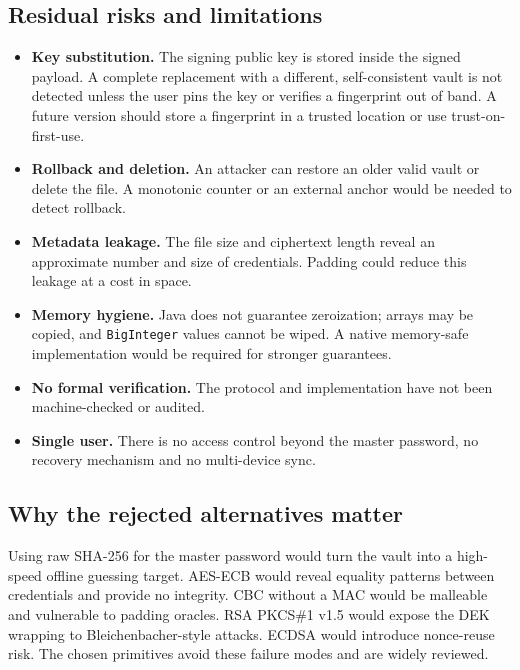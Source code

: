 \documentclass[11pt,a4paper]{article}
\newcommand{\code}[1]{\texttt{#1}}
\begin{document}
\subsection{Residual risks and limitations}\label{sec:limitations}

\begin{itemize}[leftmargin=*]
  \item \textbf{Key substitution.} The signing public key is stored inside the
        signed payload. A complete replacement with a different, self-consistent
        vault is not detected unless the user pins the key or verifies a
        fingerprint out of band. A future version should store a fingerprint in
        a trusted location or use trust-on-first-use.
  \item \textbf{Rollback and deletion.} An attacker can restore an older valid
        vault or delete the file. A monotonic counter or an external anchor
        would be needed to detect rollback.
  \item \textbf{Metadata leakage.} The file size and ciphertext length reveal an
        approximate number and size of credentials. Padding could reduce this
        leakage at a cost in space.
  \item \textbf{Memory hygiene.} Java does not guarantee zeroization; arrays may
        be copied, and \code{BigInteger} values cannot be wiped. A native
        memory-safe implementation would be required for stronger guarantees.
  \item \textbf{No formal verification.} The protocol and implementation have
        not been machine-checked or audited.
  \item \textbf{Single user.} There is no access control beyond the master
        password, no recovery mechanism and no multi-device sync.
\end{itemize}

\subsection{Why the rejected alternatives matter}

Using raw SHA-256 for the master password would turn the vault into a
high-speed offline guessing target. AES-ECB would reveal equality patterns
between credentials and provide no integrity. CBC without a MAC would be
malleable and vulnerable to padding oracles. RSA PKCS\#1 v1.5 would expose the
DEK wrapping to Bleichenbacher-style attacks. ECDSA would introduce nonce-reuse
risk. The chosen primitives avoid these failure modes and are widely reviewed.
\end{document}
